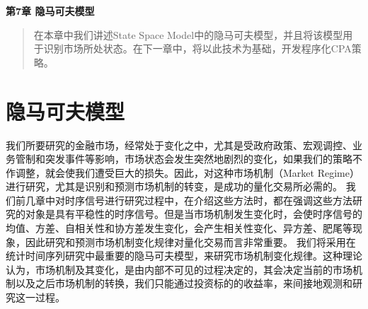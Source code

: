 \newpage
\maketitle
\begin{center}
\Large \textbf{第7章 隐马可夫模型} \quad 
\end{center}
\begin{abstract}
在本章中我们讲述State Space Model中的隐马可夫模型，并且将该模型用于识别市场所处状态。在下一章中，将以此技术为基础，开发程序化CPA策略。
\end{abstract}
\section{隐马可夫模型}
我们所要研究的金融市场，经常处于变化之中，尤其是受政府政策、宏观调控、业务管制和突发事件等影响，市场状态会发生突然地剧烈的变化，如果我们的策略不作调整，就会使我们遭受巨大的损失。因此，对这种市场机制（Market Regime）进行研究，尤其是识别和预测市场机制的转变，是成功的量化交易所必需的。\newline
我们前几章中对时序信号进行研究过程中，在介绍这些方法时，都在强调这些方法研究的对象是具有平稳性的时序信号。但是当市场机制发生变化时，会使时序信号的均值、方差、自相关性和协方差发生变化，会产生相关性变化、异方差、肥尾等现象，因此研究和预测市场机制变化规律对量化交易而言非常重要。\newline
我们将采用在统计时间序列研究中最重要的隐马可夫模型，来研究市场机制变化规律。这种理论认为，市场机制及其变化，是由内部不可见的过程决定的，其会决定当前的市场机制以及之后市场机制的转换，我们只能通过投资标的的收益率，来间接地观测和研究这一过程。
